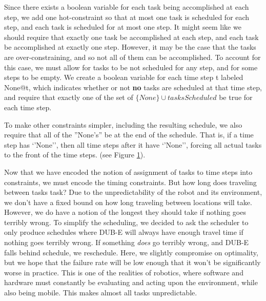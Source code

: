 \documentclass{article}
\begin{document}
Since there exists a boolean variable for
each task being accomplished at each step,
we add one hot-constraint
so that at most one task is scheduled for each step,
and each task is scheduled for at most one step.
It might seem like we should require that
exactly one task be accomplished at each step,
and each task be accomplished at exactly one step.
However, it may be the case that
the tasks are over-constraining,
and so not all of them can be accomplished.
To account for this case,
we must allow for tasks to be not scheduled for any step,
and for some steps to be empty.
We create a boolean variable for each time step t labeled None@t,
which indicates whether or not \textbf{no} tasks are scheduled at that time step,
and require that exactly one of the set of $\{None\} \cup tasksScheduled$
be true for each time step.

To make other constraints simpler,
including the resulting schedule,
we also require that all of the ''None's''
be at the end of the schedule.
That is, if a time step has ‘’None’’,
then all time steps after it have ‘’None’’,
forcing all actual tasks to the front of the time steps.
(see Figure \ref{fig:none-constraints}).
\begin{figure}
  \caption{}
  \label{fig:none-constraints}
\end{figure}

Now that we have encoded
the notion of assignment of tasks to time steps
into constraints,
we must encode the timing constraints.
But how long does traveling between tasks task?
Due to the unpredictability of the robot and its environment,
we don't have a fixed bound on how long traveling between locations will take.
However, we do have a notion of the longest they should take
if nothing goes terribly wrong.
To simplify the scheduling,
we decided to ask the scheduler to only produce
schedules where DUB-E will always have enough travel time
if nothing goes terribly wrong.
If something \textit{does} go terribly wrong,
and DUB-E falls behind schedule,
we reschedule.
Here, we slightly compromise on optimality,
but we hope that the failure rate
will be low enough that
it won't be significantly worse in practice.
This is one of the realities of robotics, where
software and hardware must constantly be evaluating
and acting upon the environment, while also being mobile.
This makes almost all tasks unpredictable.
\end{document}
